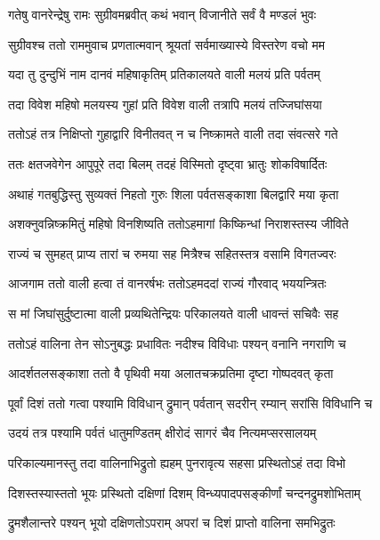
\twolineshloka
{गतेषु वानरेन्द्रेषु रामः सुग्रीवमब्रवीत्}
{कथं भवान् विजानीते सर्वं वै मण्डलं भुवः} %

\twolineshloka
{सुग्रीवश्च ततो राममुवाच प्रणतात्मवान्}
{श्रूयतां सर्वमाख्यास्ये विस्तरेण वचो मम} %

\twolineshloka
{यदा तु दुन्दुभिं नाम दानवं महिषाकृतिम्}
{प्रतिकालयते वाली मलयं प्रति पर्वतम्} %

\twolineshloka
{तदा विवेश महिषो मलयस्य गुहां प्रति}
{विवेश वाली तत्रापि मलयं तज्जिघांसया} %

\twolineshloka
{ततोऽहं तत्र निक्षिप्तो गुहाद्वारि विनीतवत्}
{न च निष्क्रामते वाली तदा संवत्सरे गते} %

\twolineshloka
{ततः क्षतजवेगेन आपुपूरे तदा बिलम्}
{तदहं विस्मितो दृष्ट्वा भ्रातुः शोकविषार्दितः} %

\twolineshloka
{अथाहं गतबुद्धिस्तु सुव्यक्तं निहतो गुरुः}
{शिला पर्वतसङ्काशा बिलद्वारि मया कृता} %

\twolineshloka
{अशक्नुवन्निष्क्रमितुं महिषो विनशिष्यति}
{ततोऽहमागां किष्किन्धां निराशस्तस्य जीविते} %

\twolineshloka
{राज्यं च सुमहत् प्राप्य तारां च रुमया सह}
{मित्रैश्च सहितस्तत्र वसामि विगतज्वरः} %

\twolineshloka
{आजगाम ततो वाली हत्वा तं वानरर्षभः}
{ततोऽहमददां राज्यं गौरवाद् भययन्त्रितः} %

\twolineshloka
{स मां जिघांसुर्दुष्टात्मा वाली प्रव्यथितेन्द्रियः}
{परिकालयते वाली धावन्तं सचिवैः सह} %

\twolineshloka
{ततोऽहं वालिना तेन सोऽनुबद्धः प्रधावितः}
{नदीश्च विविधाः पश्यन् वनानि नगराणि च} %

\twolineshloka
{आदर्शतलसङ्काशा ततो वै पृथिवी मया}
{अलातचक्रप्रतिमा दृष्टा गोष्पदवत् कृता} %

\twolineshloka
{पूर्वां दिशं ततो गत्वा पश्यामि विविधान् द्रुमान्}
{पर्वतान् सदरीन् रम्यान् सरांसि विविधानि च} %

\twolineshloka
{उदयं तत्र पश्यामि पर्वतं धातुमण्डितम्}
{क्षीरोदं सागरं चैव नित्यमप्सरसालयम्} %

\twolineshloka
{परिकाल्यमानस्तु तदा वालिनाभिद्रुतो ह्यहम्}
{पुनरावृत्य सहसा प्रस्थितोऽहं तदा विभो} %

\twolineshloka
{दिशस्तस्यास्ततो भूयः प्रस्थितो दक्षिणां दिशम्}
{विन्ध्यपादपसङ्कीर्णां चन्दनद्रुमशोभिताम्} %

\twolineshloka
{द्रुमशैलान्तरे पश्यन् भूयो दक्षिणतोऽपराम्}
{अपरां च दिशं प्राप्तो वालिना समभिद्रुतः} %

